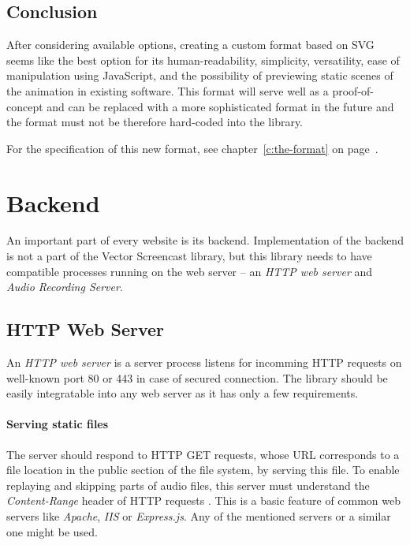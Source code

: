 \subsection{Conclusion}
After considering available options, creating a custom format based on SVG seems like the best option for its human-readability, simplicity, versatility, ease of manipulation using JavaScript, and the possibility of previewing static scenes of the animation in existing software. This format will serve well as a proof-of-concept and can be replaced with a more sophisticated format in the future and the format must not be therefore hard-coded into the library.

For the specification of this new format, see chapter~\ref{c:the-format} on page~\pageref{c:the-format}.









\section{Backend}
An important part of every website is its backend. Implementation of the backend is not a part of the Vector Screencast library, but this library needs to have compatible processes running on the web server -- an \textit{HTTP web server} and \textit{Audio Recording Server}.

\subsection{HTTP Web Server}
An \textit{HTTP web server} is a server process listens for incomming HTTP requests on well-known port 80 or 443 in case of secured connection. The library should be easily integratable into any web server as it has only a few requirements.

\paragraph{Serving static files}
The server should respond to HTTP GET requests, whose URL corresponds to a file location in the public section of the file system, by serving this file. To enable replaying and skipping parts of audio files, this server must understand the \textit{Content-Range} header of HTTP requests \cite{content_range}. This is a basic feature of common web servers like \textit{Apache}, \textit{IIS} or \textit{Express.js}. Any of the mentioned servers or a similar one might be used.

